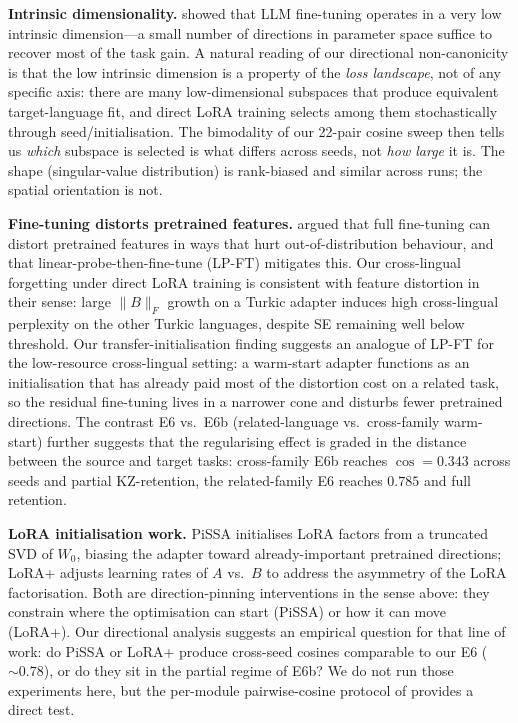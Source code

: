 \documentclass[11pt]{article}
\begin{document}
\textbf{Intrinsic dimensionality.} \citet{aghajanyan2021intrinsic} showed that LLM fine-tuning operates in a very low intrinsic dimension---a small number of directions in parameter space suffice to recover most of the task gain. A natural reading of our directional non-canonicity is that the low intrinsic dimension is a property of the \emph{loss landscape}, not of any specific axis: there are many low-dimensional subspaces that produce equivalent target-language fit, and direct LoRA training selects among them stochastically through seed/initialisation. The bimodality of our 22-pair cosine sweep then tells us \emph{which} subspace is selected is what differs across seeds, not \emph{how large} it is. The shape (singular-value distribution) is rank-biased and similar across runs; the spatial orientation is not.

\textbf{Fine-tuning distorts pretrained features.} \citet{kumar2022finetuning} argued that full fine-tuning can distort pretrained features in ways that hurt out-of-distribution behaviour, and that linear-probe-then-fine-tune (LP-FT) mitigates this. Our cross-lingual forgetting under direct LoRA training is consistent with feature distortion in their sense: large $\|B\|_F$ growth on a Turkic adapter induces high cross-lingual perplexity on the other Turkic languages, despite SE remaining well below threshold. Our transfer-initialisation finding suggests an analogue of LP-FT for the low-resource cross-lingual setting: a warm-start adapter functions as an initialisation that has already paid most of the distortion cost on a related task, so the residual fine-tuning lives in a narrower cone and disturbs fewer pretrained directions. The contrast E6 vs.\ E6b (related-language vs.\ cross-family warm-start) further suggests that the regularising effect is graded in the distance between the source and target tasks: cross-family E6b reaches $\cos = 0.343$ across seeds and partial KZ-retention, the related-family E6 reaches $0.785$ and full retention.

\textbf{LoRA initialisation work.} PiSSA \cite{meng2024pissa} initialises LoRA factors from a truncated SVD of $W_0$, biasing the adapter toward already-important pretrained directions; LoRA+ \cite{hayou2024loraplus} adjusts learning rates of $A$ vs.\ $B$ to address the asymmetry of the LoRA factorisation. Both are direction-pinning interventions in the sense above: they constrain where the optimisation can start (PiSSA) or how it can move (LoRA+). Our directional analysis suggests an empirical question for that line of work: do PiSSA or LoRA+ produce cross-seed cosines comparable to our E6 ($\sim 0.78$), or do they sit in the partial regime of E6b? We do not run those experiments here, but the per-module pairwise-cosine protocol of  provides a direct test.
\end{document}

